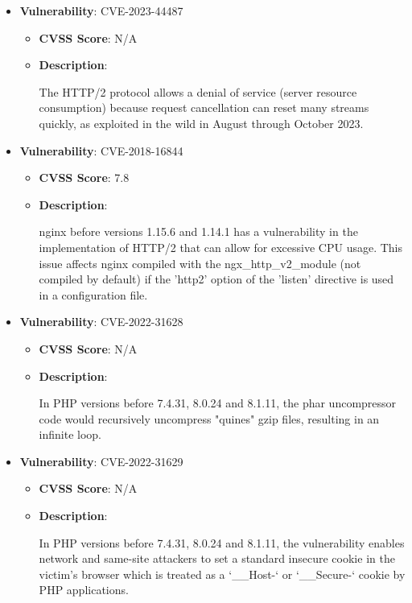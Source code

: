 \documentclass{article}
\begin{document}
\begin{itemize}
    
        \item \textbf{Vulnerability}: CVE-2023-44487
        \begin{itemize}
            \item \textbf{CVSS Score}:  N/A 
            \item \textbf{Description}:
            \parbox[t]{0.9\linewidth}{
                \ttfamily The HTTP/2 protocol allows a denial of service (server resource consumption) because request cancellation can reset many streams quickly, as exploited in the wild in August through October 2023.
            }
        \end{itemize}
    
        \item \textbf{Vulnerability}: CVE-2018-16844
        \begin{itemize}
            \item \textbf{CVSS Score}:  7.8 
            \item \textbf{Description}:
            \parbox[t]{0.9\linewidth}{
                \ttfamily nginx before versions 1.15.6 and 1.14.1 has a vulnerability in the implementation of HTTP/2 that can allow for excessive CPU usage. This issue affects nginx compiled with the ngx\_http\_v2\_module (not compiled by default) if the 'http2' option of the 'listen' directive is used in a configuration file.
            }
        \end{itemize}
    
        \item \textbf{Vulnerability}: CVE-2022-31628
        \begin{itemize}
            \item \textbf{CVSS Score}:  N/A 
            \item \textbf{Description}:
            \parbox[t]{0.9\linewidth}{
                \ttfamily In PHP versions before 7.4.31, 8.0.24 and 8.1.11, the phar uncompressor code would recursively uncompress "quines" gzip files, resulting in an infinite loop.
            }
        \end{itemize}
    
        \item \textbf{Vulnerability}: CVE-2022-31629
        \begin{itemize}
            \item \textbf{CVSS Score}:  N/A 
            \item \textbf{Description}:
            \parbox[t]{0.9\linewidth}{
                \ttfamily In PHP versions before 7.4.31, 8.0.24 and 8.1.11, the vulnerability enables network and same-site attackers to set a standard insecure cookie in the victim's browser which is treated as a `\_\_Host-` or `\_\_Secure-` cookie by PHP applications.
            }
        \end{itemize}
    

\end{itemize}
\end{document}
